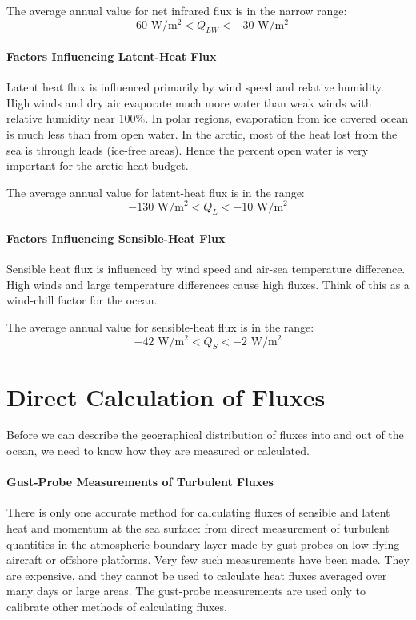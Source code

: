 The average annual value for net infrared flux is in the narrow range:
\begin{equation}
-60 \text{\ W/m$^2$} < Q_{LW} < -30 \text{\ W/m$^2$}
\end{equation}

\paragraph{Factors Influencing Latent-Heat Flux}
Latent heat flux is influenced primarily by
wind speed and relative humidity. High winds and dry air evaporate
much more water than weak winds with relative humidity near 100\%. In
polar regions, evaporation from ice covered ocean is much less than
from open water. In the arctic, most of the heat lost from the sea is
through leads (ice-free areas). Hence the percent open water is very
important for the arctic heat budget.

The average annual value for latent-heat flux is in the range:
\begin{equation}
-130 \text{\ W/m$^2$} < Q_{L} < -10 \text{\ W/m$^2$}
\end{equation}

\paragraph{Factors Influencing Sensible-Heat Flux}
Sensible heat flux is influenced by wind
speed and air-sea temperature difference. High winds and large
temperature differences cause high fluxes. Think of this as a
wind-chill factor for the ocean.

The average annual value for sensible-heat flux is in the range:
\begin{equation}
-42 \text{\ W/m$^2$} < Q_{S} < -2 \text{\ W/m$^2$}
\end{equation}

\section[Direct Calculation of Fluxes]{Direct Calculation of Fluxes}
Before we can describe the geographical distribution of fluxes into
and out of the ocean, we need to know how they are measured or
calculated.

\paragraph{Gust-Probe Measurements of Turbulent Fluxes}
There is only
one accurate method for calculating fluxes of sensible and latent heat
and momentum at the sea surface: from direct measurement of turbulent
quantities in the atmospheric boundary layer made by gust probes on
low-flying aircraft or offshore platforms. Very few such measurements
have been made. They are expensive, and they cannot be used to
calculate heat fluxes averaged over
many days or large areas. The gust-probe measurements are used only to
calibrate other methods of calculating fluxes.

